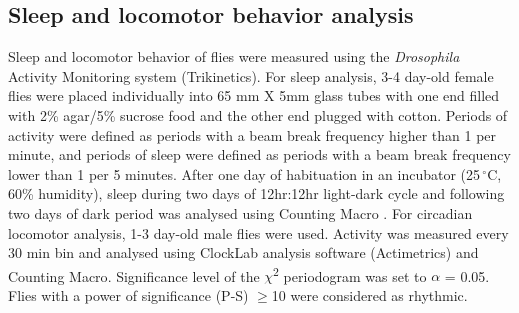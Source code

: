 \subsection*{Sleep and locomotor behavior analysis}

Sleep and locomotor behavior of flies were measured using the \emph{Drosophila} Activity Monitoring system (Trikinetics).
For sleep analysis, 3-4 day-old female flies were placed individually into 65 mm X 5mm glass tubes with one end filled with 2\% agar/5\% sucrose food and the other end plugged with cotton.
Periods of activity were defined as periods with a beam break frequency higher than 1 per minute, and periods of sleep were defined as periods with a beam break frequency lower than 1 per 5 minutes\cite{Shaw:2000ui}.
After one day of habituation in an incubator (25$\,^{\circ}\mathrm{C}$, 60\% humidity), sleep during two days of 12hr:12hr light-dark cycle and following two days of dark period was analysed using Counting Macro \cite{pfeiffenberger:2010ab}.
For circadian locomotor analysis, 1-3 day-old male flies were used. Activity was measured every 30 min bin and analysed using ClockLab analysis software (Actimetrics) and Counting Macro\cite{pfeiffenberger:2010aa}. Significance level of the $\chi$\textsuperscript{2} periodogram was set to $\alpha$ = 0.05.
Flies with a power of significance (P-S) $\geq$10 were considered as rhythmic.
